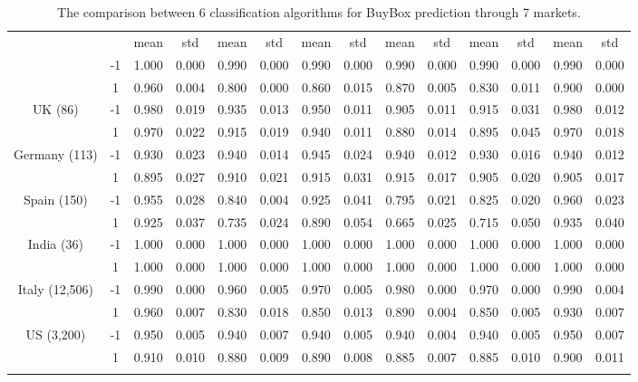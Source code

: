 \begin{center}
\begin{table}[htb]
\begin{tabular}{ |c|c|c|c|c|c|c|c|c|c|c|c|c|c| }
			& &	 mean &	std	 & mean & std & mean &std & mean & std & mean & std	& mean & std \\ 
			\specialrule{.1em}{.05em}{.05em} 
			\multirow{2}{*}{France (475,612)}	&  -1 &1.000 &0.000 &0.990	&0.000 &0.990 &0.000 &0.990 &0.000 &0.990 &0.000 &0.990 &0.000 \\ 
												&	1 &0.960 &0.004	&0.800	&0.000 &0.860 &0.015 &0.870	&0.005 &0.830 &0.011 &0.900	&0.000 \\ 
			\hline
			\multirow{2}{*}{UK (86)}	&-1	&0.980	&0.019	&0.935	&0.013	&0.950	&0.011	&0.905	&0.011	&0.915	&0.031	&0.980	&0.012 \\ 
										&1	&0.970	&0.022	&0.915	&0.019	&0.940	&0.011	&0.880	&0.014	&0.895	&0.045	&0.970	&0.018 \\ 
			\hline
			\multirow{2}{*}{Germany (113)}  &-1	&0.930	&0.023	&0.940	&0.014	&0.945	&0.024	&0.940	&0.012	&0.930	&0.016	&0.940	&0.012 \\ 
											&1	&0.895	&0.027	&0.910	&0.021	&0.915	&0.031	&0.915	&0.017	&0.905	&0.020	&0.905	&0.017 \\ 
			\hline
			\multirow{2}{*}{Spain (150)}	&-1	&0.955	&0.028	&0.840	&0.004	&0.925	&0.041	&0.795	&0.021	&0.825	&0.020	&0.960	&0.023 \\ 
											&1	&0.925	&0.037	&0.735	&0.024	&0.890	&0.054	&0.665	&0.025	&0.715	&0.050	&0.935	&0.040 \\ 
			\hline
			\multirow{2}{*}{India (36)}	&-1	&1.000	&0.000	&1.000	&0.000	&1.000	&0.000	&1.000	&0.000	&1.000	&0.000	&1.000	&0.000 \\ 
										&1	&1.000	&0.000	&1.000	&0.000	&1.000	&0.000	&1.000	&0.000	&1.000	&0.000	&1.000	&0.000 \\ 
			\hline
			\multirow{2}{*}{Italy (12,506)}	&-1	&0.990	&0.000	&0.960	&0.005	&0.970	&0.005	&0.980	&0.000	&0.970	&0.000	&0.990	&0.004 \\ 
											&1	&0.960	&0.007	&0.830	&0.018	&0.850	&0.013	&0.890	&0.004	&0.850	&0.005	&0.930	&0.007 \\ 
			\hline
			\multirow{2}{*}{US (3,200)}	&-1	&0.950	&0.005	&0.940	&0.007	&0.940	&0.005	&0.940	&0.004	&0.940	&0.005	&0.950	&0.007 \\ 
										&1	&0.910	&0.010	&0.880	&0.009	&0.890	&0.008	&0.885	&0.007	&0.885	&0.010	&0.900	&0.011 \\ 
			\specialrule{.2em}{.1em}{.1em} 	
	
		\end{tabular}
	\caption{The comparison between 6 classification algorithms for BuyBox prediction through 7 markets.}
	\end{table}
\end{center}